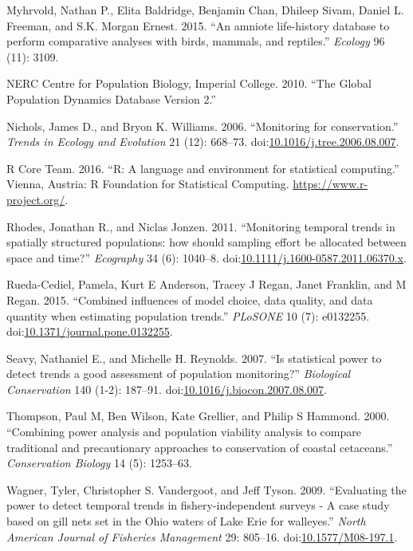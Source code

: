 \documentclass[12pt,]{article}
\begin{document}
\hypertarget{ref-Myhrvold2015}{}
Myhrvold, Nathan P., Elita Baldridge, Benjamin Chan, Dhileep Sivam,
Daniel L. Freeman, and S.K. Morgan Ernest. 2015. ``An amniote
life-history database to perform comparative analyses with birds,
mammals, and reptiles.'' \emph{Ecology} 96 (11): 3109.

\hypertarget{ref-GPDD2010}{}
NERC Centre for Population Biology, Imperial College. 2010. ``The Global
Population Dynamics Database Version 2.''

\hypertarget{ref-Nichols2006}{}
Nichols, James D., and Bryon K. Williams. 2006. ``Monitoring for
conservation.'' \emph{Trends in Ecology and Evolution} 21 (12): 668--73.
doi:\href{https://doi.org/10.1016/j.tree.2006.08.007}{10.1016/j.tree.2006.08.007}.

\hypertarget{ref-RCoreTeam2016}{}
R Core Team. 2016. ``R: A language and environment for statistical
computing.'' Vienna, Austria: R Foundation for Statistical Computing.
\url{https://www.r-project.org/}.

\hypertarget{ref-Rhodes2011}{}
Rhodes, Jonathan R., and Niclas Jonzen. 2011. ``Monitoring temporal
trends in spatially structured populations: how should sampling effort
be allocated between space and time?'' \emph{Ecography} 34 (6): 1040--8.
doi:\href{https://doi.org/10.1111/j.1600-0587.2011.06370.x}{10.1111/j.1600-0587.2011.06370.x}.

\hypertarget{ref-Rueda-Cediel2015}{}
Rueda-Cediel, Pamela, Kurt E Anderson, Tracey J Regan, Janet Franklin,
and M Regan. 2015. ``Combined influences of model choice, data quality,
and data quantity when estimating population trends.'' \emph{PLoSONE} 10
(7): e0132255.
doi:\href{https://doi.org/10.1371/journal.pone.0132255}{10.1371/journal.pone.0132255}.

\hypertarget{ref-Seavy2007}{}
Seavy, Nathaniel E., and Michelle H. Reynolds. 2007. ``Is statistical
power to detect trends a good assessment of population monitoring?''
\emph{Biological Conservation} 140 (1-2): 187--91.
doi:\href{https://doi.org/10.1016/j.biocon.2007.08.007}{10.1016/j.biocon.2007.08.007}.

\hypertarget{ref-Thompson2000}{}
Thompson, Paul M, Ben Wilson, Kate Grellier, and Philip S Hammond. 2000.
``Combining power analysis and population viability analysis to compare
traditional and precautionary approaches to conservation of coastal
cetaceans.'' \emph{Conservation Biology} 14 (5): 1253--63.

\hypertarget{ref-Wagner2009}{}
Wagner, Tyler, Christopher S. Vandergoot, and Jeff Tyson. 2009.
``Evaluating the power to detect temporal trends in fishery-independent
surveys - A case study based on gill nets set in the Ohio waters of Lake
Erie for walleyes.'' \emph{North American Journal of Fisheries
Management} 29: 805--16.
doi:\href{https://doi.org/10.1577/M08-197.1}{10.1577/M08-197.1}.
\end{document}
